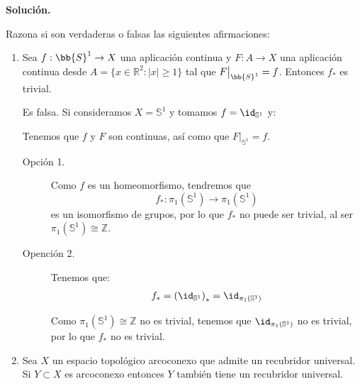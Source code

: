 \documentclass[12pt]{article}
\begin{document}
    \newpage
    \setcounter{ejercicio}{0} %
    \noindent
    \textbf{Solución.}

    \begin{ejercicio}
        Razona si son verdaderas o falsas las siguientes afirmaciones:
        \begin{enumerate}[label=\alph*)]
            \item Sea $f:\bb{S}^1\to X$ una aplicación continua y $F:A\to X$ una aplicación continua desde $A=\{x\in \mathbb{R}^2 : |x|\geq 1\}$ tal que $F\big|_{\bb{S}^1} = f$. Entonces $f_\ast$ es trivial.

                Es falsa. Si consideramos $X = \mathbb{S}^1$ y tomamos $f = \id_{\mathbb{S}^1}$ y:
                
                Tenemos que $f$ y $F$ son continuas, así como que $F\big|_{\mathbb{S}^1} = f$.
                \begin{description}
                    \item[Opción 1.] Como $f$ es un homeomorfismo, tendremos que $$f_\ast:\pi_1(\mathbb{S}^1)\to \pi_1(\mathbb{S}^1)$$
                    es un isomorfismo de grupos, por lo que $f_\ast$ no puede ser trivial, al ser $\pi_1(\mathbb{S}^1)\cong \mathbb{Z}$.
                    \item[Opención 2.] Tenemos que:
                    \begin{align*}
                        f_* = \left(\id_{\mathbb{S}^1}\right)_* = \id_{\pi_1(\mathbb{S}^1)}
                    \end{align*}

                    Como $\pi_1(\mathbb{S}^1)\cong \mathbb{Z}$ no es trivial, tenemos que $\id_{\pi_1(\mathbb{S}^1)}$ no es trivial, por lo que $f_\ast$ no es trivial.
                \end{description}
            \item Sea $X$ un espacio topológico arcoconexo que admite un recubridor universal. Si $Y\subset X$ es arcoconexo entonces $Y$ también tiene un recubridor universal. 


\end{enumerate}
\end{ejercicio}
\end{document}
